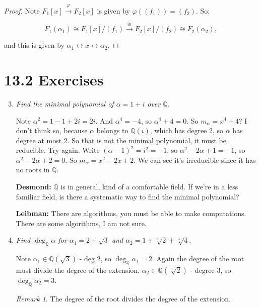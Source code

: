 \documentclass[9pt,reqno,twoside]{amsbook}
\theoremstyle{plain}
\numberwithin{section}{chapter}
\numberwithin{equation}{chapter}
\theoremstyle{definition}
\theoremstyle{remark}
\newtheorem{rem}[theorem]{Remark}
\theoremstyle{plain}
\newcommand{\Q}{\mathbb{Q}}
\renewcommand{\bar}{\overline}%
\renewcommand{\phi}{\varphi}
\begin{document}
\begin{proof}
Note $F_1[x] \overset{\phi}{\to} F_2[x]$ is given by $\phi((f_1)) = (f_2)$. So:

$$
F_1(\alpha_1) \cong F_1[x]/(f_1) \overset{\cong}{\to} F_2[x]/(f_2) \cong F_2(\alpha_2),
$$ 

and this is given by $\alpha_1 \leftrightarrow \bar{x} \leftrightarrow \alpha_2$. 
\end{proof}

\section*{13.2 Exercises}






\begin{enumerate}[label=\arabic*.]

\setcounter{enumi}{2}

\item \textit{Find the minimal polynomial of $\alpha = 1 + i$ over $\Q$. }

Note $\alpha^2 = 1 - 1 + 2i = 2i$. And $\alpha^4 = -4$, so $\alpha^4 + 4 = 0$. So $m_\alpha = x^4 + 4$? I don't think so, because $\alpha$ belongs to $\Q(i)$, which has degree 2, so $\alpha$ has degree at most 2. So that is not the minimal polynomial, it must be reducible. Try again. Write $(\alpha - 1)^2 = i^2 = -1$, so $\alpha^2 - 2\alpha + 1 = -1$, so $\alpha^2 - 2\alpha + 2 = 0$. So $m_\alpha = x^2 - 2x + 2$. We can see it's irreducible since it has no roots in $\Q$. 


\textbf{Desmond: }$\Q$ is in general, kind of a comfortable field. If we're in a less familiar field, is there a systematic way to find the minimal polynomial?

\textbf{Leibman: }There are algorithms, you must be able to make computations. There are some algorithms, I am not sure. 
 
\item \textit{Find $\deg_\Q \alpha$ for $\alpha_1 = 2 + \sqrt{3}$ and $\alpha_2 = 1 + \sqrt[3]{2} + \sqrt[3]{4}$.  }

Note $\alpha_1 \in \Q(\sqrt{3})$ - deg 2, so $\deg_\Q \alpha_1 = 2$. Again the degree of the root must divide the degree of the extension. $\alpha_2 \in \Q(\sqrt[3]{2})$ - degree 3, so $\deg_\Q\alpha_2 = 3$. 

\begin{rem}
The degree of the root divides the degree of the extension. 
\end{rem}


\end{enumerate}
\end{document}
